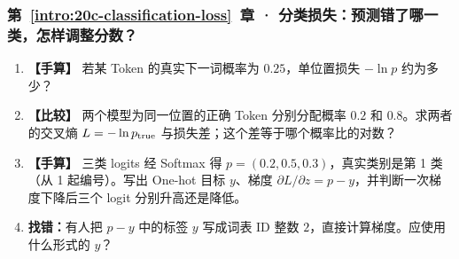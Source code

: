 \subsubsection*{第~\ref*{intro:20c-classification-loss}~章 · 分类损失：预测错了哪一类，怎样调整分数？}
\begin{enumerate}[label={},leftmargin=4.8em,itemsep=4pt]
\item[\textbf{C-043.}] \leavevmode{}\label{exercise:C-043}\label{exercise:single-token-cross-entropy}\textbf{【手算】} 若某 Token 的真实下一词概率为 $0.25$，单位置损失 $-\ln p$ 约为多少？
\item[\textbf{C-044.}] \leavevmode{}\label{exercise:C-044}\label{exercise:probability-loss-ratio}\label{exercise:linked-20c-classification-loss}  \textbf{【比较】} 两个模型为同一位置的正确 Token 分别分配概率 $0.2$ 和 $0.8$。求两者的交叉熵 $L=-\ln p_{\rm true}$ 与损失差；这个差等于哪个概率比的对数？
\item[\textbf{C-045.}] \leavevmode{}\label{exercise:C-045}\label{exercise:softmax-logit-gradient}\textbf{【手算】} 三类 logits 经 Softmax 得 $p=(0.2,0.5,0.3)$，真实类别是第 1 类（从 1 起编号）。写出 One-hot 目标 $y$、梯度 $\partial L/\partial z=p-y$，并判断一次梯度下降后三个 logit 分别升高还是降低。
\item[\textbf{C-046.}] \leavevmode{}\label{exercise:C-046}\label{exercise:one-hot-gradient-target}\textbf{找错：}有人把 $p-y$ 中的标签 $y$ 写成词表 ID 整数 $2$，直接计算梯度。应使用什么形式的 $y$？
\end{enumerate}
